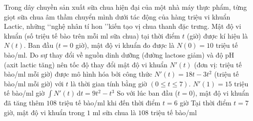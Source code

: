 \begin{ex}%
	Trong dây chuyền sản xuất sữa chua hiện đại của một nhà máy thực phẩm, từng giọt sữa chua âm thầm chuyển mình dưới tác động của hàng triệu vi khuẩn Lactic, những \lq \lq nghệ nhân tí hon \rq \rq kiến tạo vị  chua thanh đặc trưng. Mật độ vi khuẩn (số triệu tế bào trên mỗi ml sữa chua) tại thời điểm $t$ (giờ) được kí hiệu là $N(t)$. Ban đầu ($t=0$ giờ), mật độ vi khuẩn đo được là $N(0)=10$ triệu tế bào/ml. Do sự thay đổi về nguồn dinh dưỡng (đường lactose giảm) và độ pH (axit lactic tăng) nên tốc độ thay đổi mật độ vi khuẩn $N'(t)$ (đơn vị: triệu tế bào/ml mỗi giờ) được mô hình hóa bởi công thức $N'(t) = 18t - 3t^2$ (triệu tế bào/ml mỗi giờ) với $t$ là thời gian tính bằng giờ $(0 \leq t \leq 7)$.
	\choiceTF 
		{\True $N'(1)=15$ triệu tế bào/ml  giờ}
		{$\displaystyle\int N'(t)  \mathrm{\,d}t=9t^2-t^3$}
		 {\True So với lúc ban đầu ($t=0$), mật độ vi khuẩn đã tăng thêm $108$ triệu tế bào/ml khi đến thời điểm $t=6$ giờ}
		{\True Tại thời điểm $t=7$ giờ, mật độ vi khuẩn trong $1$ ml sữa  chua là $108$ triệu tế bào/ml}
\end{ex}

